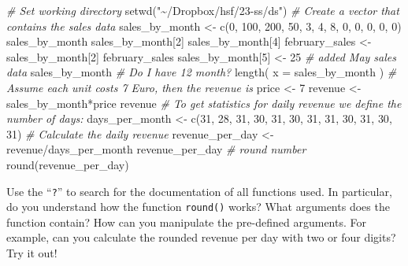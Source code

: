 \documentclass[
  12pt,
  oneside]{book}
\newenvironment{Shaded}{\begin{snugshade}}{\end{snugshade}}
\newcommand{\AttributeTok}[1]{\textcolor[rgb]{0.77,0.63,0.00}{#1}}
\newcommand{\CommentTok}[1]{\textcolor[rgb]{0.56,0.35,0.01}{\textit{#1}}}
\newcommand{\DecValTok}[1]{\textcolor[rgb]{0.00,0.00,0.81}{#1}}
\newcommand{\FunctionTok}[1]{\textcolor[rgb]{0.00,0.00,0.00}{#1}}
\newcommand{\NormalTok}[1]{#1}
\newcommand{\OtherTok}[1]{\textcolor[rgb]{0.56,0.35,0.01}{#1}}
\newcommand{\SpecialCharTok}[1]{\textcolor[rgb]{0.00,0.00,0.00}{#1}}
\newcommand{\StringTok}[1]{\textcolor[rgb]{0.31,0.60,0.02}{#1}}
\begin{document}
\begin{Shaded}
\begin{Highlighting}[]
\CommentTok{\# Set working directory}
\FunctionTok{setwd}\NormalTok{(}\StringTok{"\textasciitilde{}/Dropbox/hsf/23{-}ss/ds"}\NormalTok{)}
\CommentTok{\# Create a vector that contains the sales data}
\NormalTok{sales\_by\_month }\OtherTok{\textless{}{-}} \FunctionTok{c}\NormalTok{(}\DecValTok{0}\NormalTok{, }\DecValTok{100}\NormalTok{, }\DecValTok{200}\NormalTok{, }\DecValTok{50}\NormalTok{, }\DecValTok{3}\NormalTok{, }\DecValTok{4}\NormalTok{, }\DecValTok{8}\NormalTok{, }\DecValTok{0}\NormalTok{, }\DecValTok{0}\NormalTok{, }\DecValTok{0}\NormalTok{, }\DecValTok{0}\NormalTok{, }\DecValTok{0}\NormalTok{)}
\NormalTok{sales\_by\_month}
\NormalTok{sales\_by\_month[}\DecValTok{2}\NormalTok{]}
\NormalTok{sales\_by\_month[}\DecValTok{4}\NormalTok{]}
\NormalTok{february\_sales }\OtherTok{\textless{}{-}}\NormalTok{ sales\_by\_month[}\DecValTok{2}\NormalTok{]}
\NormalTok{february\_sales}
\NormalTok{sales\_by\_month[}\DecValTok{5}\NormalTok{] }\OtherTok{\textless{}{-}} \DecValTok{25} \CommentTok{\# added May sales data}
\NormalTok{sales\_by\_month}
\CommentTok{\# Do I have 12 month?}
\FunctionTok{length}\NormalTok{( }\AttributeTok{x =}\NormalTok{ sales\_by\_month )}
\CommentTok{\# Assume each unit costs 7 Euro, then the revenue is}
\NormalTok{price }\OtherTok{\textless{}{-}} \DecValTok{7}
\NormalTok{revenue }\OtherTok{\textless{}{-}}\NormalTok{ sales\_by\_month}\SpecialCharTok{*}\NormalTok{price}
\NormalTok{revenue}
\CommentTok{\# To get statistics for daily revenue we define the number of days:}
\NormalTok{days\_per\_month }\OtherTok{\textless{}{-}} \FunctionTok{c}\NormalTok{(}\DecValTok{31}\NormalTok{, }\DecValTok{28}\NormalTok{, }\DecValTok{31}\NormalTok{, }\DecValTok{30}\NormalTok{, }\DecValTok{31}\NormalTok{, }\DecValTok{30}\NormalTok{, }\DecValTok{31}\NormalTok{, }\DecValTok{31}\NormalTok{, }\DecValTok{30}\NormalTok{, }\DecValTok{31}\NormalTok{, }\DecValTok{30}\NormalTok{, }\DecValTok{31}\NormalTok{)}
\CommentTok{\# Calculate the daily revenue}
\NormalTok{revenue\_per\_day }\OtherTok{\textless{}{-}}\NormalTok{ revenue}\SpecialCharTok{/}\NormalTok{days\_per\_month}
\NormalTok{revenue\_per\_day }
\CommentTok{\# round number }
\FunctionTok{round}\NormalTok{(revenue\_per\_day) }
\end{Highlighting}
\end{Shaded}

Use the ``\texttt{?}'' to search for the documentation of all functions used. In particular, do you understand how the function \texttt{round()} works? What arguments does the function contain? How can you manipulate the pre-defined arguments. For example, can you calculate the rounded revenue per day with two or four digits? Try it out!
\end{document}
